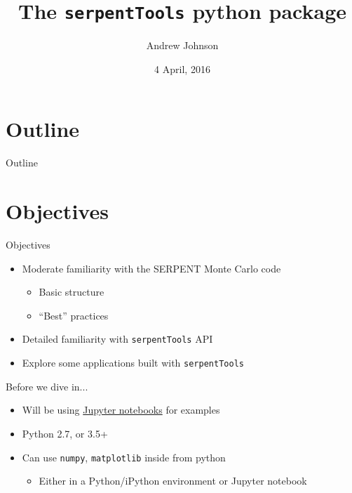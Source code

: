 \documentclass{beamer}
\title{The \texttt{serpentTools} python package}
\author{Andrew Johnson}
\date{4 April, 2016}
\newcommand{\st}{\texttt{serpentTools} }
\begin{document}
\begin{frame}
\titlepage
\end{frame}

\section*{Outline}
\begin{frame}{Outline}
    \begin{multicols}{2}
        \tableofcontents[hideallsubsections]
    \end{multicols}
\end{frame}

\section{Objectives}
\begin{frame}{Objectives}
    \begin{itemize}
        \item Moderate familiarity with the SERPENT Monte Carlo code
        \begin{itemize}
            \item Basic structure
            \item ``Best'' practices
        \end{itemize}
        \item Detailed familiarity with \st API
        \item Explore some applications built with \st
    \end{itemize}
\end{frame}

\begin{frame}{Before we dive in...}
    \begin{itemize}
        \item Will be using \href{https://jupyter.org/}{Jupyter notebooks} for examples
        \item Python 2.7, or 3.5+
        \item Can use \texttt{numpy}, \texttt{matplotlib} inside from python
            \begin{itemize}
                \item Either in a Python/iPython environment or Jupyter notebook
            \end{itemize}
    \end{itemize}
\end{frame}
\end{document}
